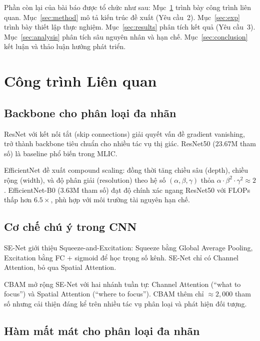 \documentclass[conference]{IEEEtran}
\begin{document}
Phần còn lại của bài báo được tổ chức như sau:
Mục~\ref{sec:related} trình bày công trình liên quan.
Mục~\ref{sec:method} mô tả kiến trúc đề xuất (Yêu cầu~2).
Mục~\ref{sec:exp} trình bày thiết lập thực nghiệm.
Mục~\ref{sec:results} phân tích kết quả (Yêu cầu~3).
Mục~\ref{sec:analysis} phân tích sâu nguyên nhân và hạn chế.
Mục~\ref{sec:conclusion} kết luận và thảo luận hướng phát triển.

\section{Công trình Liên quan}
\label{sec:related}

\subsection{Backbone cho phân loại đa nhãn}

ResNet \cite{he2016deep} với kết nối tắt (skip connections) giải quyết
vấn đề gradient vanishing, trở thành backbone tiêu chuẩn cho nhiều tác vụ thị giác.
ResNet50 ($23.67\text{M}$ tham số) là baseline phổ biến trong MLIC.

EfficientNet \cite{tan2019efficientnet} đề xuất compound scaling:
đồng thời tăng chiều sâu (depth), chiều rộng (width), và độ phân giải (resolution)
theo hệ số $(\alpha, \beta, \gamma)$ thỏa $\alpha \cdot \beta^2 \cdot \gamma^2 \approx 2$.
EfficientNet-B0 ($3.63\text{M}$ tham số) đạt độ chính xác ngang ResNet50
với FLOPs thấp hơn $6.5\times$, phù hợp với môi trường tài nguyên hạn chế.

\subsection{Cơ chế chú ý trong CNN}

SE-Net \cite{hu2018squeeze} giới thiệu Squeeze-and-Excitation: 
Squeeze bằng Global Average Pooling, Excitation bằng FC + sigmoid để học
trọng số kênh. SE-Net chỉ có Channel Attention, bỏ qua Spatial Attention.

CBAM \cite{woo2018cbam} mở rộng SE-Net với hai nhánh tuần tự:
Channel Attention (``what to focus'') và Spatial Attention (``where to focus'').
CBAM thêm chỉ $\approx 2{,}000$ tham số nhưng cải thiện đáng kể trên
nhiều tác vụ phân loại và phát hiện đối tượng.

\subsection{Hàm mất mát cho phân loại đa nhãn}
\end{document}
